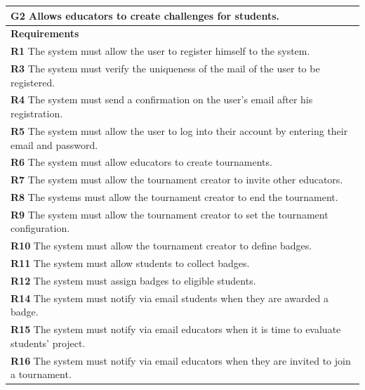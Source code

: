 \begin{table}[H]
    \begin{tabularx}{\textwidth}{X}
        \toprule
        \textbf{G2} Allows educators to create challenges for students.                                                    \\ \midrule
        \textbf{Requirements}                                                                                                        \\ \midrule
        \textbf{R1} The system must allow the user to register himself to the system.                                                   \\
        \textbf{R3} The system must verify the uniqueness of the mail of the user to be registered.                                       \\ 
        \textbf{R4} The system must send a confirmation on the user's email after his registration.                         \\ 
        \textbf{R5} The system must allow the user to log into their account by entering their email and password.           \\
        \textbf{R6} The system must allow educators to create tournaments.              \\ 
        \textbf{R7} The system must allow the tournament creator to invite other educators.         \\ 
        \textbf{R8} The systems must allow the tournament creator to end the tournament.     \\ 
        \textbf{R9} The system must allow the tournament creator to set the tournament configuration.          \\ 
        \textbf{R10} The system must allow the tournament creator to define badges.      \\ 
        \textbf{R11} The system must allow students to collect badges.        \\ 
        \textbf{R12} The system must assign badges to eligible students.          \\  
        \textbf{R14} The system must notify via email students when they are awarded a badge. \\ 
        \textbf{R15} The system must notify via email educators when it is time to evaluate students' project.      \\ 
        \textbf{R16} The system must notify via email educators when they are invited to join a tournament.      \\

\end{tabularx}
\end{table}
